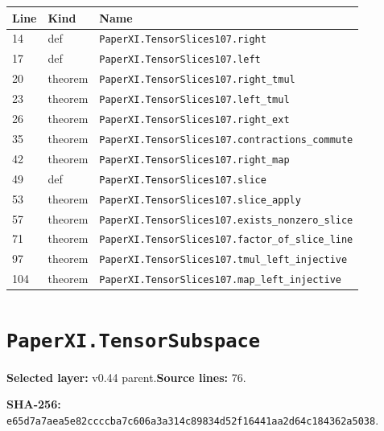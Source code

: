 \documentclass[10pt,oneside]{book}
\begin{document}
\begin{longtable}{@{}p{}p{}p{}@{}}\toprule Line&Kind&Name\\\midrule\endhead

14&def&\nolinkurl{PaperXI.TensorSlices107.right}\\

17&def&\nolinkurl{PaperXI.TensorSlices107.left}\\

20&theorem&\nolinkurl{PaperXI.TensorSlices107.right_tmul}\\

23&theorem&\nolinkurl{PaperXI.TensorSlices107.left_tmul}\\

26&theorem&\nolinkurl{PaperXI.TensorSlices107.right_ext}\\

35&theorem&\nolinkurl{PaperXI.TensorSlices107.contractions_commute}\\

42&theorem&\nolinkurl{PaperXI.TensorSlices107.right_map}\\

49&def&\nolinkurl{PaperXI.TensorSlices107.slice}\\

53&theorem&\nolinkurl{PaperXI.TensorSlices107.slice_apply}\\

57&theorem&\nolinkurl{PaperXI.TensorSlices107.exists_nonzero_slice}\\

71&theorem&\nolinkurl{PaperXI.TensorSlices107.factor_of_slice_line}\\

97&theorem&\nolinkurl{PaperXI.TensorSlices107.tmul_left_injective}\\

104&theorem&\nolinkurl{PaperXI.TensorSlices107.map_left_injective}\\

\bottomrule\end{longtable}

\section{\texorpdfstring{\nolinkurl{PaperXI.TensorSubspace}}{PaperXI.TensorSubspace}}\label{module:PaperXI.TensorSubspace}

\textbf{Selected layer:} v0.44 parent.\quad\textbf{Source lines:} 76.\par\textbf{SHA-256:} {\scriptsize\nolinkurl{e65d7a7aea5e82ccccba7c606a3a314c89834d52f16441aa2d64c184362a5038}}.
\end{document}
